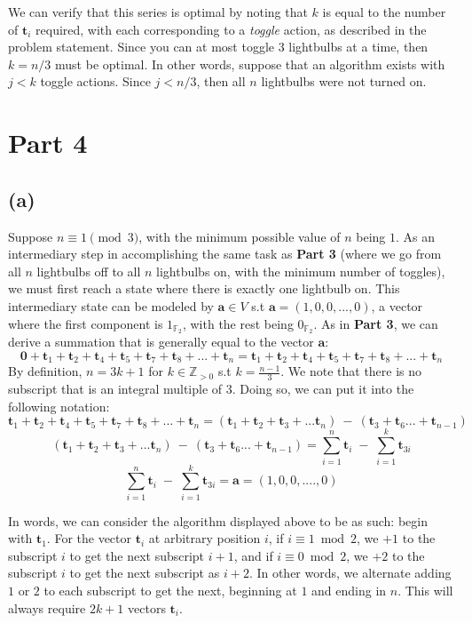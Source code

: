 \documentclass[12pt, letterpaper]{article}
\newcommand{\F}{\mathbb{F}}
\newcommand{\Z}{\mathbb{Z}}
\newcommand{\0}{\textbf{0}}
\newcommand{\1}{\textbf{1}}
\renewcommand{\t}{\textbf{t}}
\renewcommand{\a}{\textbf{a}}
\begin{document}
We can verify that this series is optimal by noting that $k$ is equal to the number of $\t_i$ required, with each corresponding to a \emph{toggle} action, as described in the problem statement. Since you can at most toggle $3$ lightbulbs at a time, then $k=n/3$ must be optimal. In other words, suppose that an algorithm exists with $j < k$ toggle actions. Since $j < n/3$, then all $n$ lightbulbs were not turned on.

\section*{Part 4}

\subsection*{(a)}

Suppose $n \equiv 1\pmod{3}$, with the minimum possible value of $n$ being $1$. As an intermediary step in accomplishing the same task as \textbf{Part 3} (where we go from all $n$ lightbulbs off to all $n$ lightbulbs on, with the minimum number of toggles), we must first reach a state where there is exactly one lightbulb on. This intermediary state can be modeled by $\a \in V$ s.t $\a = (1, 0, 0, ..., 0)$, a vector where the first component is $1_{\F_2}$, with the rest being $0_{\F_2}$. As in \textbf{Part 3}, we can derive a summation that is generally equal to the vector $\a$:
$$\0 + \t_1+\t_2+\t_4+\t_5+\t_7+\t_8+...+\t_n =  \t_1+\t_2+\t_4+\t_5+\t_7+\t_8+...+\t_n$$
By definition, $n = 3k+1$ for $k \in \Z_{>0}$ s.t $k=\frac{n-1}{3}$. We note that there is no subscript that is an integral multiple of 3. Doing so, we can put it into the following notation:
$$ \t_1+\t_2+\t_4+\t_5+\t_7+\t_8+...+\t_n = (\t_1 + \t_2 + \t_3 + ... \t_n) \: - \: (\t_3 + \t_6 ... + \t_{n-1})$$
$$(\t_1 + \t_2 + \t_3 + ... \t_n) \: - \: (\t_3 + \t_6 ... + \t_{n-1}) = \sum_{i=1}^{n} \t_i \; - \; \sum_{i=1}^{k} \t_{3i}$$
$$ \sum_{i=1}^{n} \t_i \; - \; \sum_{i=1}^{k} \t_{3i} = \a = (1, 0, 0, ...., 0)$$

In words, we can consider the algorithm displayed above to be as such: begin with $\t_1$. For the vector $\t_i$ at arbitrary position $i$, if $i \equiv 1\bmod{2}$, we $+1$ to the subscript $i$ to get the next subscript $i+1$, and if $i \equiv 0\bmod{2}$, we $+2$ to the subscript $i$ to get the next subscript as $i+2$. In other words, we alternate adding $1$ or $2$ to each subscript to get the next, beginning at $1$ and ending in $n$. This will always require $2k+1$ vectors $\t_i$. 
\end{document}
